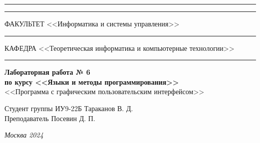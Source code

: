 \documentclass[a4paper, 14pt]{extarticle}
\begin{document}
\begin{titlepage}
		\vspace{-25pt}
		\hspace{-35pt}\rule{\textwidth}{2.3pt}
		
		\vspace*{-20.3pt}
		\hspace{-35pt}\rule{\textwidth}{0.4pt}
		
		\vspace{1.5ex}
		\hspace{-35pt} \noindent \small ФАКУЛЬТЕТ\hspace{80pt} <<Информатика и системы управления>>
		
		\vspace*{-16pt}
		\hspace{47pt}\rule{0.83\textwidth}{0.4pt}
		
		\vspace{0.5ex}
		\hspace{-35pt} \noindent \small КАФЕДРА\hspace{50pt} <<Теоретическая информатика и компьютерные технологии>>
		
		\vspace*{-16pt}
		\hspace{30pt}\rule{0.866\textwidth}{0.4pt}
		
		\vspace{11em}
		
		\begin{center}
			\Large {\bf Лабораторная работа № 6} \\ 
			\large {\bf по курсу <<Языки и методы программирования>>} \\
			\large <<Программа с графическим пользовательским интерфейсом>> 
		\end{center}\normalsize
		
		\vspace{8em}
		
		
		\begin{flushright}
			{Студент группы ИУ9-22Б Тараканов В. Д. \hspace*{15pt}\\ 
				\vspace{2ex}
				Преподаватель Посевин Д. П.\hspace*{15pt}}
		\end{flushright}
		
		\bigskip
		
		\vfill
		
		
		\begin{center}
			\textsl{Москва 2024}
		\end{center}
	\end{titlepage}
	
\end{document}
